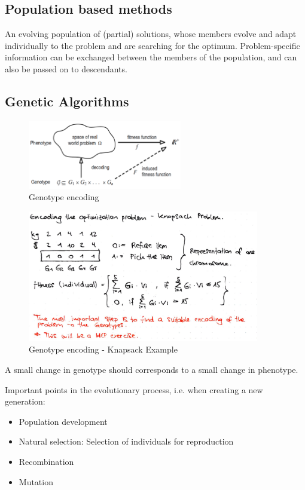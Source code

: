 \subsection{Population based methods}
An evolving population of (partial) solutions, whose
members evolve and adapt individually to the problem and are
searching for the optimum. Problem-specific information can be
exchanged between the members of the population, and can
also be passed on to descendants.

\clearpage
\subsection{Genetic Algorithms}

\begin{figure}[H]
\centering
\includegraphics[width=0.6\textwidth]{figures/encodingGenotype.png}
\caption{Genotype encoding}
\end{figure}

\begin{figure}[H]
\centering
\includegraphics[width=0.9\textwidth]{figures/knapsackGenotype.png}
\caption{Genotype encoding - Knapsack Example}
\end{figure}

A small change in genotype should corresponds to a small
change in phenotype.

Important points in the evolutionary process, i.e. when creating a new generation:
\begin{itemize}
    \item Population development
    \item Natural selection: Selection of individuals for reproduction
    \item Recombination
    \item Mutation
\end{itemize}

